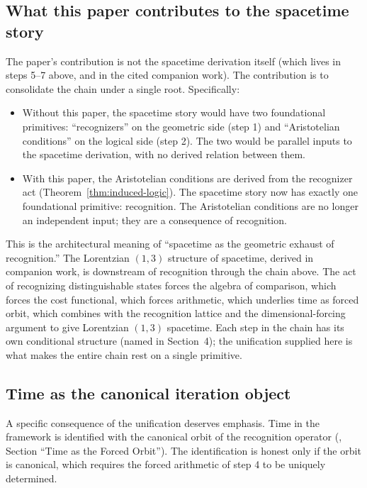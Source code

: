 \documentclass[11pt,a4paper]{article}
\theoremstyle{definition}
\theoremstyle{remark}
\begin{document}
\subsection{What this paper contributes to the spacetime story}

The paper's contribution is not the spacetime derivation itself
(which lives in steps 5--7 above, and in the cited companion work).
The contribution is to consolidate the chain under a single root.
Specifically:

\begin{itemize}[leftmargin=1.6em]
\item Without this paper, the spacetime story would have two
foundational primitives: ``recognizers'' on the geometric side
(step 1) and ``Aristotelian conditions'' on the logical side
(step 2). The two would be parallel inputs to the spacetime
derivation, with no derived relation between them.
\item With this paper, the Aristotelian conditions are derived from
the recognizer act (Theorem~\ref{thm:induced-logic}). The spacetime
story now has exactly one foundational primitive: recognition. The
Aristotelian conditions are no longer an independent input; they are
a consequence of recognition.
\end{itemize}

This is the architectural meaning of ``spacetime as the geometric
exhaust of recognition.'' The Lorentzian $(1, 3)$ structure of
spacetime, derived in companion work, is downstream of recognition
through the chain above. The act of recognizing distinguishable
states forces the algebra of comparison, which forces the cost
functional, which forces arithmetic, which underlies time as forced
orbit, which combines with the recognition lattice and the
dimensional-forcing argument to give Lorentzian $(1, 3)$ spacetime.
Each step in the chain has its own conditional structure (named in
Section~4); the unification supplied here is what makes the entire
chain rest on a single primitive.

\subsection{Time as the canonical iteration object}

A specific consequence of the unification deserves emphasis. Time
in the framework is identified with the canonical orbit of the
recognition operator (\cite{Washburn2026RealityFromOneDistinction},
Section ``Time as the Forced Orbit''). The identification is
honest only if the orbit is canonical, which requires the forced
arithmetic of step 4 to be uniquely determined.
\end{document}
